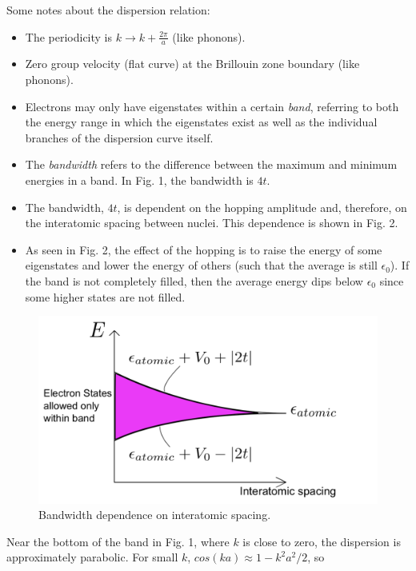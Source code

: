 \documentclass[10pt]{article}
\begin{document}
Some notes about the dispersion relation:
\begin{itemize}
  \item The periodicity is $k \rightarrow k + \frac{2\pi}{a}$ (like phonons).
  \item Zero group velocity (flat curve) at the Brillouin zone boundary (like phonons).
  \item Electrons may only have eigenstates within a certain \emph{band}, referring to both
  the energy range in which the eigenstates exist as well as the individual branches
  of the dispersion curve itself.
  \item The \emph{bandwidth} refers to the difference between the maximum and minimum energies
  in a band. In Fig. 1, the bandwidth is $4t$.
  \item The bandwidth, $4t$, is dependent on the hopping amplitude and, therefore, on the
  interatomic spacing between nuclei. This dependence is shown in Fig. 2.
  \item As seen in Fig. 2, the effect of the hopping is to raise the energy of some eigenstates and lower the
  energy of others (such that the average is still $\epsilon_{0}$). If the band is not completely filled, then
  the average energy dips below $\epsilon_{0}$ since some higher states are not filled.
\end{itemize}

\begin{figure}
  \centering
    \includegraphics[width=\textwidth]{tb2}
    \caption{Bandwidth dependence on interatomic spacing.}
\end{figure}

Near the bottom of the band in Fig. 1, where $k$ is close to zero, the dispersion is approximately parabolic. For
small $k$, $cos(ka) \approx 1 - k^{2}a^{2}/2$, so
\end{document}
